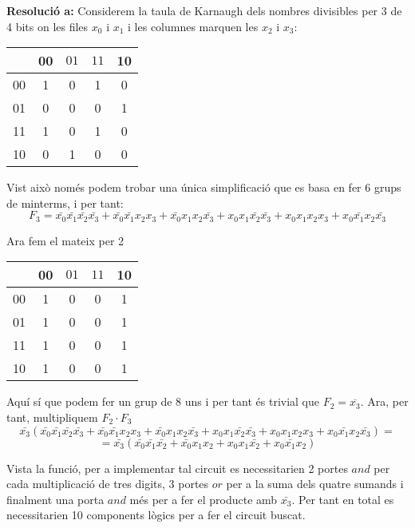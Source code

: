\documentclass[12pt, a4papre]{article}
\begin{document}
	\newpage	
	\textbf{Resolució a:} Considerem la taula de Karnaugh dels nombres divisibles per 3 de 4 bits on les files $x_0$ i $x_1$ i les columnes marquen les $x_2$ i $x_3$:
	\begin{center}
	\begin{tabular}{c|| c c c c} 
	  & 00 & $01$ &$11$ & 10\\ [0.5ex] 
	 \hline\hline
	 00 & 1 & 0 & 1 & 0\\ 

	 01 & 0 & 0  & 0 & 1\\

	 11 & 1 & 0 & 1 & 0\\

	 10 & 0 & 1 & 0 & 0\\
	\end{tabular}
	\end{center}
	
	Vist això només podem trobar una única simplificació que es basa en fer 6 grups de minterms, i per tant:
	\[
	F_3 = \bar{x_0}\bar{x_1}\bar{x_2}\bar{x_3} + \bar{x_0}\bar{x_1}x_2x_3 + \bar{x_0}x_1x_2\bar{x_3} + x_0x_1\bar{x_2}\bar{x_3} + x_0x_1x_2x_3 + x_0\bar{x_1}x_2\bar{x_3}
	\]
	
	Ara fem el mateix per 2
	\begin{center}
	\begin{tabular}{c|| c c c c} 
	  & 00 & $01$ &$11$ & 10\\ [0.5ex] 
	 \hline\hline
	 00 & 1 & 0 & 0 & 1\\ 

	 01 & 1 & 0  & 0 & 1\\

	 11 & 1 & 0 & 0 & 1\\

	 10 & 1 & 0 & 0 & 1\\
	\end{tabular}
	\end{center}
	
	Aquí sí que podem fer un grup de 8 uns i per tant és trivial que $F_2 = \overline{x_3}$. Ara, per tant, multipliquem $F_2\cdot F_3$
	\[
	\bar{x_3}(\bar{x_0}\bar{x_1}\bar{x_2}\bar{x_3} + \bar{x_0}\bar{x_1}x_2x_3 + \bar{x_0}x_1x_2\bar{x_3} + x_0x_1\bar{x_2}\bar{x_3} + x_0x_1x_2x_3 + x_0\bar{x_1}x_2\bar{x_3})=
	\]
	\[
	=\bar{x_3}(\bar{x_0}\bar{x_1}\bar{x_2} + \bar{x_0}x_1x_2+ x_0x_1\bar{x_2}+ x_0\bar{x_1}x_2)
	\]
	
	Vista la funció, per a implementar tal circuit es necessitarien 2 portes $and$ per cada multiplicació de tres digits, 3 portes $or$ per a la suma dels quatre sumands i finalment una porta $and$ més per a fer el producte amb $\bar{x_3}$. Per tant en total es necessitarien 10 components lògics per a fer el circuit buscat.\\\\
	
\end{document}

